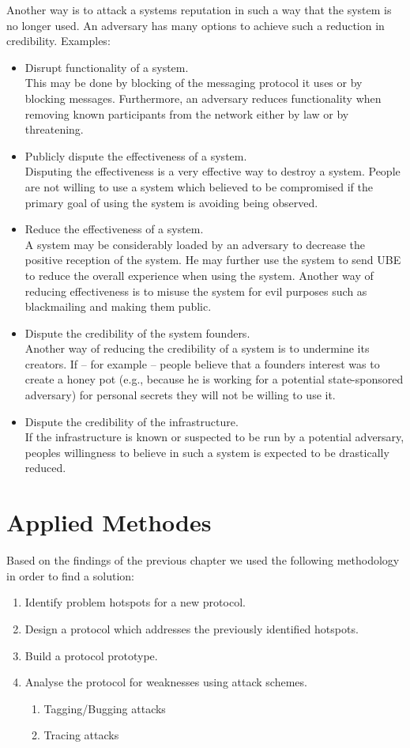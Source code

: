 Another way is to attack a systems reputation in such a way that the system is no longer used. An adversary has many options to achieve such a reduction in credibility. Examples:
\begin{itemize}
	\item Disrupt functionality of a system.\\ 
	This may be done by blocking of the messaging protocol it uses or by blocking messages. Furthermore, an adversary reduces functionality when removing known participants from the network either by law or by threatening.
	\item Publicly dispute the effectiveness of a system.\\
    Disputing the effectiveness is a very effective way to destroy a system. People are not willing to use a system which believed to be compromised if the primary goal of using the system is avoiding being observed.
	\item Reduce the effectiveness of a system.\\
    A system may be considerably loaded by an adversary to decrease the positive reception of the system. He may further use the system to send UBE to reduce the overall experience when using the system. Another way of reducing effectiveness is to misuse the system for evil purposes such as blackmailing and making them public.
	\item Dispute the credibility of the system founders.\\
    Another way of reducing the credibility of a system is to undermine its creators. If -- for example -- people believe that a founders interest was to create a honey pot (e.g., because he is working for a potential state-sponsored adversary) for personal secrets they will not be willing to use it.
	\item Dispute the credibility of the infrastructure.\\
    If the infrastructure is known or suspected to be run by a potential adversary, peoples willingness to believe in such a system is expected to be drastically reduced.
\end{itemize}

\chapter{Applied Methodes\label{sec:appliedMethods}}
Based on the findings of the previous chapter we used the following methodology in order to find a solution:
\begin{enumerate}
	\item Identify problem hotspots for a new protocol.
	\item Design a protocol which addresses the previously identified hotspots.
	\item Build a protocol prototype.
	\item Analyse the protocol for weaknesses using attack schemes.
	\begin{enumerate}
		\item Tagging/Bugging attacks
		\item Tracing attacks
	\end{enumerate}
\end{enumerate}

